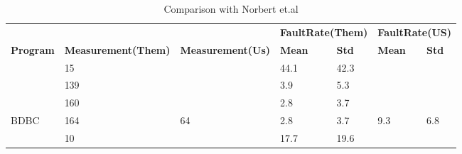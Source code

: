 \begin{table*}[]
\centering
\caption{Comparison with Norbert et.al \cite{siegmund2012predicting}}
\label{my-label}
\begin{tabular}{|l|l|l|ll|l|l|}
\hline
                                   &                                              &                                            & \multicolumn{2}{l|}{\textbf{FaultRate(Them)}}                                    & \multicolumn{2}{l|}{\textbf{FaultRate(US)}}   \\ \cline{4-7} 
\multirow{-2}{*}{\textbf{Program}} & \multirow{-2}{*}{\textbf{Measurement(Them)}} & \multirow{-2}{*}{\textbf{Measurement(Us)}} & \multicolumn{1}{l|}{\textbf{Mean}}                & \textbf{Std}                 & \textbf{Mean}         & \textbf{Std}          \\ \hline
                                   & 15                                           &                                            & \multicolumn{1}{l|}{\cellcolor[HTML]{C0C0C0}44.1} & \cellcolor[HTML]{C0C0C0}42.3 &                       &                       \\ \cline{2-2} \cline{4-5}
                                   & 139                                          &                                            & \multicolumn{1}{l|}{3.9}                          & 5.3                          &                       &                       \\ \cline{2-2} \cline{4-5}
                                   & 160                                          &                                            & \multicolumn{1}{l|}{2.8}                          & 3.7                          &                       &                       \\ \cline{2-2} \cline{4-5}
\multirow{-4}{*}{BDBC}             & 164                                          & \multirow{-4}{*}{64}                       & \multicolumn{1}{l|}{2.8}                          & 3.7                          & \multirow{-4}{*}{9.3} & \multirow{-4}{*}{6.8} \\ \hline
                                   & 10                                           &                                            & \multicolumn{1}{l|}{\cellcolor[HTML]{C0C0C0}17.7} & \cellcolor[HTML]{C0C0C0}19.6 &                       &                       \\ \cline{2-2} \cline{4-5}

\end{tabular}
\end{table*}
